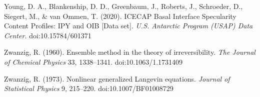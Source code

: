 \documentclass[tc, manuscript]{copernicus}
\begin{document}
\begin{thebibliography}{}
Young, D. A., Blankenship, D. D., Greenbaum, J., Roberts, J., Schroeder, D., Siegert, M., \& van Ommen, T. (2020). ICECAP Basal Interface Specularity Content Profiles: IPY and OIB [Data set]. \emph{U.S. Antarctic Program (USAP) Data Center.} doi:10.15784/601371

Zwanzig, R. (1960). Ensemble method in the theory of irreversibility. \emph{The Journal of Chemical Physics} 33, 1338–1341. doi:10.1063/1.1731409

Zwanzig, R. (1973). Nonlinear generalized Langevin equations. \emph{Journal of Statistical Physics} 9, 215–220. doi:10.1007/BF01008729

\end{thebibliography}
\end{document}
